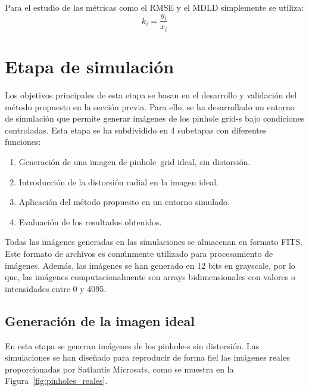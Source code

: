 \documentclass[12pt]{article}
\numberwithin{equation}{section}%
\newcommand{\lightit}[1]{{\lightitfont #1}}
\begin{document}
Para el estudio de las métricas como el RMSE y el MDLD simplemente se utiliza:
\begin{equation}
    k_i=\frac{y_i}{x_i}
\end{equation}

\section{Etapa de simulación}
\label{sec:Simulacion}

Los objetivos principales de esta etapa se basan en el  desarrollo y validación del método propuesto en la sección previa. Para ello, se ha desarrollado un entorno de simulación que permite generar imágenes de los \lightit{pinhole grid}-s bajo condiciones controladas. Esta etapa se ha subdividido en 4 subetapas con diferentes funciones:   

\begin{enumerate}
\item Generación de una imagen de \lightit{pinhole\ grid} ideal, sin distorsión.
\item Introducción de la distorsión radial en la imagen ideal.
\item Aplicación del método propuesto en un entorno simulado.
\item Evaluación de los resultados obtenidos.
\end{enumerate}

Todas las imágenes generadas en las simulaciones se almacenan en formato FITS. Este formato de archivos es comúnmente utilizado para procesamiento de imágenes. Además, las imágenes se han generado en 12 bits en grayscale, por lo que, las imágenes computacionalmente son arrays bidimensionales con valores o intensidades entre 0 y 4095. 

\subsection{Generación de la imagen ideal}
\label{sec:gen_img_ideal}
En esta etapa se generan imágenes de los \lightit{pinhole}-s sin distorsión. Las simulaciones se han diseñado para reproducir de forma fiel las imágenes reales proporcionadas por Satlantis Microsats, como se muestra en la Figura~\ref{fig:pinholes_reales}.\\
\end{document}
